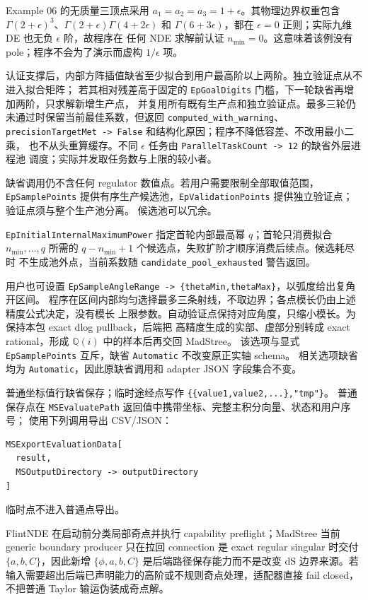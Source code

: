\documentclass[11pt,a4paper]{ctexart}
\begin{document}
Example 06 的无质量三顶点采用
$a_1=a_2=a_3=1+\epsilon$。其物理边界权重包含
$\Gamma(2+\epsilon)^3$、$\Gamma(2+\epsilon)\Gamma(4+2\epsilon)$ 和
$\Gamma(6+3\epsilon)$，都在 $\epsilon=0$ 正则；实际九维 DE 也无负 $\epsilon$ 阶，故程序在
任何 NDE 求解前认证 $n_{\min}=0$。这意味着该例没有 pole；程序不会为了演示而虚构
$1/\epsilon$ 项。

认证支撑后，内部方阵插值缺省至少拟合到用户最高阶以上两阶。独立验证点从不进入拟合矩阵；
若其相对残差高于固定的 \texttt{EpGoalDigits} 门槛，下一轮缺省再增加两阶，只求解新增生产点，
并复用所有既有生产点和独立验证点。最多三轮仍未通过时保留当前最佳系数，但返回
\texttt{computed\_with\_warning}、\texttt{precisionTargetMet -> False} 和结构化原因；程序不降低容差、不改用最小二乘，
也不从头重算缓存。不同 $\epsilon$ 任务由 \texttt{ParallelTaskCount -> 12} 的缺省外层进程池
调度；实际并发取任务数与上限的较小者。

缺省调用仍不含任何 regulator 数值点。若用户需要限制全部取值范围，
\texttt{EpSamplePoints} 提供有序生产候选池，\texttt{EpValidationPoints} 提供独立验证点；
验证点须与整个生产池分离。
候选池可以冗余。

\texttt{EpInitialInternalMaximumPower} 指定首轮内部最高幂 $q$；首轮只消费拟合
$n_{\min},\ldots,q$ 所需的 $q-n_{\min}+1$ 个候选点，失败扩阶才顺序消费后续点。候选耗尽时
不生成池外点，当前系数随 \texttt{candidate\_pool\_exhausted} 警告返回。

用户也可设置 \texttt{EpSampleAngleRange -> \{thetaMin,thetaMax\}}，以弧度给出复角开区间。
程序在区间内部均匀选择最多三条射线，不取边界；各点模长仍由上述精度公式决定，没有模长
上限参数。自动验证点保持对应角度，只缩小模长。为保持本包 exact dlog pullback，后端把
高精度生成的实部、虚部分别转成 exact rational，形成 $\mathbb Q(i)$ 中的样本后再交回 MadStree。
该选项与显式 \texttt{EpSamplePoints} 互斥，缺省 \texttt{Automatic} 不改变原正实轴 schema。
相关选项缺省均为 \texttt{Automatic}，因此原缺省调用和 adapter JSON 字段集合不变。

普通坐标值行缺省保存；临时途经点写作
\texttt{\{\{value1,value2,...\},}\allowbreak\texttt{"tmp"\}}。
普通保存点在 \texttt{MSEvaluatePath} 返回值中携带坐标、完整主积分向量、状态和用户序号；
使用下列调用导出 CSV/JSON：
\begin{verbatim}
MSExportEvaluationData[
  result,
  MSOutputDirectory -> outputDirectory
]
\end{verbatim}
临时点不进入普通点导出。

FlintNDE 在启动前分类局部奇点并执行 capability preflight；MadStree 当前 generic boundary producer 只在拉回 connection 是 exact regular singular 时交付 $\{a,b,C\}$，因此新增 $\{\phi,a,b,C\}$ 是后端路径保存能力而不是改变 dS 边界来源。若输入需要超出后端已声明能力的高阶或不规则奇点处理，适配器直接 fail closed，不把普通 Taylor 输运伪装成奇点解。
\end{document}
